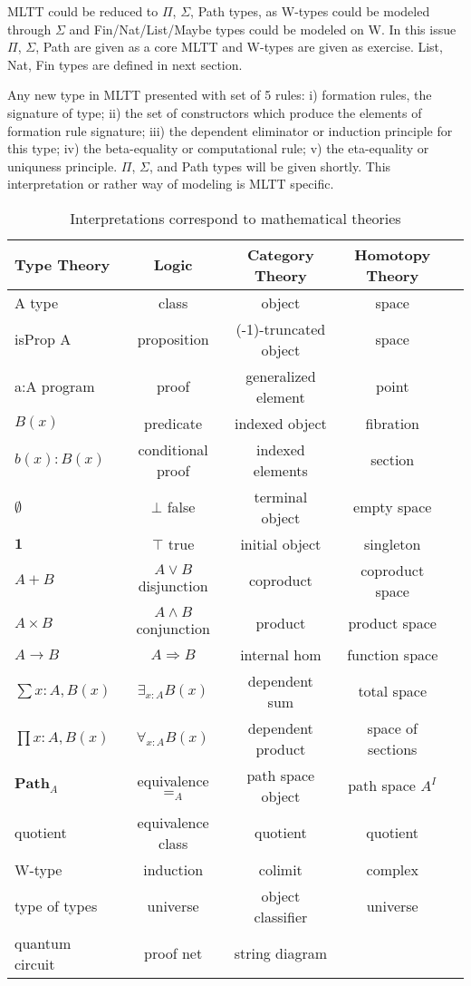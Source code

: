MLTT could be reduced to $\Pi$, $\Sigma$, Path types, as W-types could be
modeled through $\Sigma$ and Fin/Nat/List/Maybe types could be modeled on W.
In this issue $\Pi$, $\Sigma$, Path are given as a core MLTT and W-types
are given as exercise. List, Nat, Fin types are defined in
next section.

Any new type in MLTT presented with set of 5 rules: i) formation rules, the signature of type;
ii) the set of constructors which produce the elements of formation rule signature;
iii) the dependent eliminator or induction principle for this type;
iv) the beta-equality or computational rule;
v) the eta-equality or uniquness principle. $\Pi$, $\Sigma$, and Path
types will be given shortly. This interpretation or rather way of modeling is MLTT specific.

\begin{table}
\centering
  \caption{Interpretations correspond to mathematical theories}
 \begin{tabular}{lcccc}
    \hline
       Type Theory & Logic & Category Theory & Homotopy Theory\\
    \hline
       A type & class & object & space \\
       isProp A & proposition & (-1)-truncated object & space \\
       a:A program & proof & generalized element & point \\
       $B(x)$ & predicate & indexed object & fibration \\
       $b(x) : B(x)$ & conditional proof & indexed elements & section\\
       $\emptyset$ & $\bot$ false & terminal object & empty space \\
       $\mathbf{1}$ & $\top$ true & initial object & singleton \\
       $A + B$ & $A\vee B$ disjunction & coproduct & coproduct space \\
       $A\times B$ & $A\wedge B$ conjunction & product & product space \\
       $A\to B$ & $A\Rightarrow B$ & internal hom & function space \\
       $\sum{x:A},B(x)$ & $\exists_{x:A}B(x)$ & dependent sum & total space \\
       $\prod{x:A},B(x)$ & $\forall_{x:A}B(x)$ & dependent product & space of sections\\
       $\mathbf{Path}_{A}$ & equivalence $=_A$ & path space object & path space $A^I$ \\
       quotient & equivalence class & quotient & quotient \\
       W-type & induction & colimit & complex\\
       type of types & universe & object classifier & universe \\
       quantum circuit & proof net & string diagram & \\
      \hline
  \end{tabular}
\end{table}

